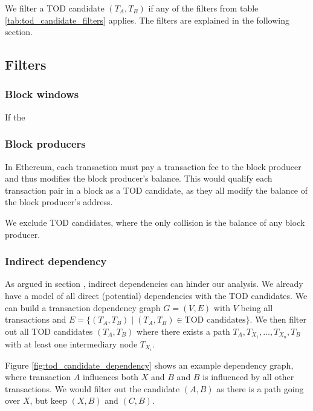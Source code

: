 \documentclass[draft,final]{vutinfth} %
\begin{document}
We filter a TOD candidate $(T_A, T_B)$ if any of the filters from table \ref{tab:tod_candidate_filters} applies. The filters are explained in the following section.

\subsection{Filters}

\subsubsection{Block windows}

If the

\subsubsection{Block producers}

In Ethereum, each transaction must pay a transaction fee to the block producer and thus modifies the block producer's balance. This would qualify each transaction pair in a block as a TOD candidate, as they all modify the balance of the block producer's address.

We exclude TOD candidates, where the only collision is the balance of any block producer.


\subsubsection{Indirect dependency}

\iffalse
    The overall goal of our analysis, is to analyze the effects of the transaction order. For this, we will take a TOD candidate $(T_A, T_B)$ and analyze what would have happened if they were executed in the opposite order, i.e. $(T_B, T_A)$.
\fi

As argued in section , indirect dependencies can hinder our analysis. We already have a model of all direct (potential) dependencies with the TOD candidates. We can build a transaction dependency graph $G = (V, E)$ with $V$ being all transactions and $E = \{ (T_A, T_B) \mid (T_A, T_B) \in \text{TOD candidates} \}$. We then filter out all TOD candidates $(T_A, T_B)$ where there exists a path $T_A, T_{X_1}, \dots, T_{X_n}, T_B$ with at least one intermediary node $T_{X_i}$.

Figure \ref{fig:tod_candidate_dependency} shows an example dependency graph, where transaction $A$ influences both $X$ and $B$ and $B$ is influenced by all other transactions. We would filter out the candidate $(A, B)$ as there is a path going over $X$, but keep $(X, B)$ and $(C, B)$.
\end{document}

